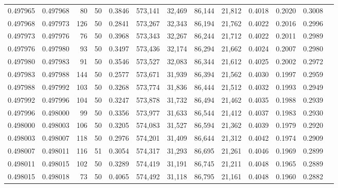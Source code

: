 \begin{tabular}{rrrrrrrrrrrrr}
0.497965 & 0.497968 &    80 &  50 &                                     0.3846 & 573,141 &  32,469 &  86,144 &  21,812 & 0.4018 & 0.2020 & 0.3008 \\
0.497968 & 0.497973 &   126 &  50 &                                     0.2841 & 573,267 &  32,343 &  86,194 &  21,762 & 0.4022 & 0.2016 & 0.2996 \\
0.497973 & 0.497976 &    76 &  50 &                                     0.3968 & 573,343 &  32,267 &  86,244 &  21,712 & 0.4022 & 0.2011 & 0.2989 \\
0.497976 & 0.497980 &    93 &  50 &                                     0.3497 & 573,436 &  32,174 &  86,294 &  21,662 & 0.4024 & 0.2007 & 0.2980 \\
0.497980 & 0.497983 &    91 &  50 &                                     0.3546 & 573,527 &  32,083 &  86,344 &  21,612 & 0.4025 & 0.2002 & 0.2972 \\
0.497983 & 0.497988 &   144 &  50 &                                     0.2577 & 573,671 &  31,939 &  86,394 &  21,562 & 0.4030 & 0.1997 & 0.2959 \\
0.497988 & 0.497992 &   103 &  50 &                                     0.3268 & 573,774 &  31,836 &  86,444 &  21,512 & 0.4032 & 0.1993 & 0.2949 \\
0.497992 & 0.497996 &   104 &  50 &                                     0.3247 & 573,878 &  31,732 &  86,494 &  21,462 & 0.4035 & 0.1988 & 0.2939 \\
0.497996 & 0.498000 &    99 &  50 &                                     0.3356 & 573,977 &  31,633 &  86,544 &  21,412 & 0.4037 & 0.1983 & 0.2930 \\
0.498000 & 0.498003 &   106 &  50 &                                     0.3205 & 574,083 &  31,527 &  86,594 &  21,362 & 0.4039 & 0.1979 & 0.2920 \\
0.498003 & 0.498007 &   118 &  50 &                                     0.2976 & 574,201 &  31,409 &  86,644 &  21,312 & 0.4042 & 0.1974 & 0.2909 \\
0.498007 & 0.498011 &   116 &  51 &                                     0.3054 & 574,317 &  31,293 &  86,695 &  21,261 & 0.4046 & 0.1969 & 0.2899 \\
0.498011 & 0.498015 &   102 &  50 &                                     0.3289 & 574,419 &  31,191 &  86,745 &  21,211 & 0.4048 & 0.1965 & 0.2889 \\
0.498015 & 0.498018 &    73 &  50 &                                     0.4065 & 574,492 &  31,118 &  86,795 &  21,161 & 0.4048 & 0.1960 & 0.2882 \\

\end{tabular}
